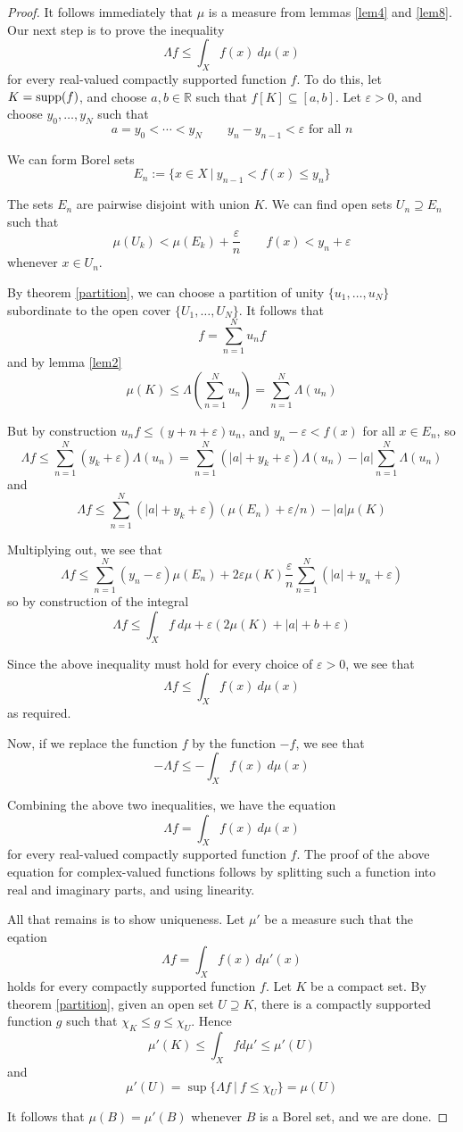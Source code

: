 \begin{proof}
It follows immediately that $\mu$ is a measure from lemmas \ref{lem4} and \ref{lem8}.  Our next step is to prove the inequality
$$\Lambda f \leq \int_X f(x)\ d\mu (x)$$
for every real-valued compactly supported function $f$.  To do this, let $K = \operatorname{supp} (f)$, and choose $a,b\in {\mathbb R}$ such that $f[K]\subseteq [a,b]$.  Let $\varepsilon >0$, and choose $y_0 ,\ldots ,y_N$ such that
$$a=y_0 < \cdots < y_N \qquad y_n - y_{n-1} <\varepsilon \textrm{ for all }n$$

We can form Borel sets
$$E_n := \{ x\in X \ | \ y_{n-1} < f(x) \leq y_n \}$$

The sets $E_n$ are pairwise disjoint with union $K$.  We can find open sets $U_n \supseteq E_n$ such that
$$\mu (U_k ) < \mu (E_k ) + \frac{\varepsilon}{n} \qquad f(x) < y_n + \varepsilon$$
whenever $x\in U_n$.

By theorem \ref{partition}, we can choose a partition of unity $\{ u_1 , \ldots , u_N \}$ subordinate to the open cover $\{ U_1 ,\ldots , U_N \}$.  It follows that
$$f = \sum_{n=1}^N u_n f$$
and by lemma \ref{lem2}
$$\mu (K) \leq \Lambda \left( \sum_{n=1}^N u_n \right) = \sum_{n=1}^N \Lambda (u_n)$$

But by construction $u_nf \leq (y+n + \varepsilon )u_n$, and $y_n - \varepsilon< f(x)$ for all $x\in E_n$, so
$$\Lambda f \leq \sum_{n=1}^N (y_k + \varepsilon) \Lambda (u_n) = \sum_{n=1}^N (|a|+ y_k + \varepsilon) \Lambda (u_n) - |a| \sum_{n=1}^N \Lambda (u_n)$$
and
$$\Lambda f \leq \sum_{n=1}^N (|a|+ y_k + \varepsilon) (\mu (E_n) + \varepsilon /n ) - |a| \mu (K)$$

Multiplying out, we see that
$$\Lambda f \leq \sum_{n=1}^N (y_n - \varepsilon )\mu (E_n) + 2\varepsilon \mu (K) \frac{\varepsilon}{n} \sum_{n=1}^N (|a| + y_n + \varepsilon )$$
so by construction of the integral
$$\Lambda f \leq \int_X f\ d\mu + \varepsilon (2\mu (K) + |a| +b +\varepsilon )$$

Since the above inequality must hold for every choice of $\varepsilon >0$, we see that
$$\Lambda f \leq \int_X f(x)\ d\mu (x)$$
as required.

Now, if we replace the function $f$ by the function $-f$, we see that
$$-\Lambda f \leq -\int_X f(x)\ d\mu (x)$$

Combining the above two inequalities, we have the equation
$$\Lambda f = \int_X f(x)\ d\mu (x)$$
for every real-valued compactly supported function $f$.  The proof of the above equation for complex-valued functions follows by splitting such a function into real and imaginary parts, and using linearity.

All that remains is to show uniqueness.  Let $\mu'$ be a measure such that the eqation
$$\Lambda f = \int_X f(x)\ d\mu' (x)$$
holds for every compactly supported function $f$.  Let $K$ be a compact set.  By theorem \ref{partition}, given an open set $U\supseteq K$, there is a compactly supported function $g$ such that $\chi_K \leq g\leq \chi_U$.  Hence
$$\mu' (K) \leq \int_X f d\mu' \leq \mu' (U)$$
and
$$\mu'(U) = \sup \{ \Lambda f \ |\ f\leq \chi_U \} = \mu (U)$$

It follows that $\mu (B)= \mu' (B)$ whenever $B$ is a Borel set, and we are done.
\end{proof}
